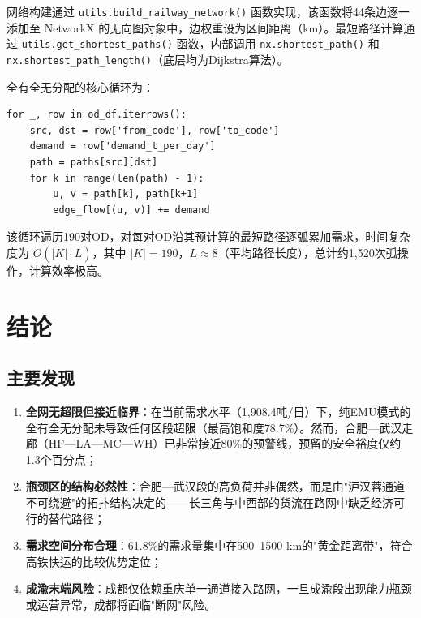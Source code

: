 \documentclass[12pt,a4paper,fontset=none]{ctexart}
\newcommand{\code}[1]{\texttt{#1}}
\begin{document}
网络构建通过 \code{utils.build\_railway\_network()} 函数实现，该函数将44条边逐一添加至 NetworkX 的无向图对象中，边权重设为区间距离（km）。最短路径计算通过 \code{utils.get\_shortest\_paths()} 函数，内部调用 \code{nx.shortest\_path()} 和 \code{nx.shortest\_path\_length()}（底层均为Dijkstra算法）。

全有全无分配的核心循环为：

\begin{verbatim}
for _, row in od_df.iterrows():
    src, dst = row['from_code'], row['to_code']
    demand = row['demand_t_per_day']
    path = paths[src][dst]
    for k in range(len(path) - 1):
        u, v = path[k], path[k+1]
        edge_flow[(u, v)] += demand
\end{verbatim}

该循环遍历190对OD，对每对OD沿其预计算的最短路径逐弧累加需求，时间复杂度为 $O(|K| \cdot \bar{L})$，其中 $|K|=190$，$\bar{L} \approx 8$（平均路径长度），总计约1,520次弧操作，计算效率极高。

\section{结论}

\subsection{主要发现}

\begin{enumerate}[leftmargin=*]
    \item \textbf{全网无超限但接近临界}：在当前需求水平（1,908.4吨/日）下，纯EMU模式的全有全无分配未导致任何区段超限（最高饱和度78.7\%）。然而，合肥—武汉走廊（HF—LA—MC—WH）已非常接近80\%的预警线，预留的安全裕度仅约1.3个百分点；
    
    \item \textbf{瓶颈区的结构必然性}：合肥—武汉段的高负荷并非偶然，而是由"沪汉蓉通道不可绕避"的拓扑结构决定的——长三角与中西部的货流在路网中缺乏经济可行的替代路径；
    
    \item \textbf{需求空间分布合理}：61.8\%的需求量集中在500--1500 km的"黄金距离带"，符合高铁快运的比较优势定位；
    
    \item \textbf{成渝末端风险}：成都仅依赖重庆单一通道接入路网，一旦成渝段出现能力瓶颈或运营异常，成都将面临"断网"风险。
\end{enumerate}
\end{document}
